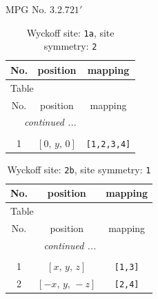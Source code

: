 \documentclass[fleqn,8pt]{jsarticle}
\begin{document}
\setcounter{MaxMatrixCols}{32}

\renewcommand{\tablename}{Table~}
\renewcommand{\figurename}{Figure~}
\begin{center}
\LARGE
MPG No. 3.2.7\quad$21'$
\end{center}
\renewcommand{\arraystretch}{1.2}
\begin{longtable}{ccc}
\caption{Wyckoff site: {\tt 1a}, site symmetry: {\tt 2}}
 \\
 \hline \hline
No. & position & mapping \\ \hline \endfirsthead

\multicolumn{2}{l}{\tablename\ \thetable{}} \\
 \hline \hline
No. & position & mapping \\ \hline \endhead

 \hline \hline
\multicolumn{2}{r}{\footnotesize\it continued ...} \\ \endfoot

 \hline \hline
\multicolumn{2}{r}{} \\ \endlastfoot

1 & $\left[ 0,\, y,\, 0 \right]$ & {\tt [1,2,3,4]} \\
\end{longtable}
\renewcommand{\arraystretch}{1.2}
\begin{longtable}{ccc}
\caption{Wyckoff site: {\tt 2b}, site symmetry: {\tt 1}}
 \\
 \hline \hline
No. & position & mapping \\ \hline \endfirsthead

\multicolumn{2}{l}{\tablename\ \thetable{}} \\
 \hline \hline
No. & position & mapping \\ \hline \endhead

 \hline \hline
\multicolumn{2}{r}{\footnotesize\it continued ...} \\ \endfoot

 \hline \hline
\multicolumn{2}{r}{} \\ \endlastfoot

1 & $\left[ x,\, y,\, z \right]$ & {\tt [1,3]} \\ \hline
2 & $\left[ - x,\, y,\, - z \right]$ & {\tt [2,4]} \\
\end{longtable}
\end{document}
